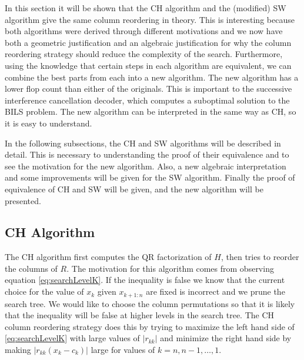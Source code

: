 \documentclass[12pt,Bold,letterpaper]{mcgilletdclass}
\begin{document}
In this section it will be shown that the CH algorithm and the  (modified)  SW algorithm give the same
column reordering in theory. This is interesting because both algorithms were derived through different motivations
and we now have both a geometric justification and an algebraic justification 
for why the column reordering strategy should reduce the complexity of the search.
Furthermore, using the knowledge that certain steps in each algorithm are equivalent,
we can combine the best parts from each into a new algorithm. The new algorithm
has a lower flop count than either of the originals.
This is important to the successive interference cancellation decoder, 
which computes a suboptimal solution to the BILS problem.
The new algorithm can be interpreted in the same way as CH,
so it is easy to understand. 

In the following subsections, the CH and SW algorithms will be described in detail. This is necessary to understanding the proof of their equivalence and to see the motivation for the new algorithm. Also, a new algebraic interpretation and some improvements will be given for the SW algorithm. Finally the proof of equivalence of CH and SW will be given, and the new algorithm will be presented.

\subsection{CH Algorithm}
The CH algorithm first computes the QR factorization of $H$,
then  tries to reorder the columns of $R$.
The motivation for this algorithm comes from observing equation \eqref{eq:searchLevelK}.
If the inequality is false we know that the current choice for the value of
$x_k$ given $x_{k+1:n}$ are fixed is incorrect and we prune the search tree. We
would like to choose the column permutations so that it is likely that the
inequality will be false at higher levels in the search tree. The CH column reordering strategy
does this by trying to maximize the left hand side of  \eqref{eq:searchLevelK} with large values of $\left | r_{kk}
\right |$ and minimize the right hand side by making $\left | r_{kk}(x_k-c_k) \right |$
large for values of $k = n,n-1, \dots, 1$.
\end{document}
